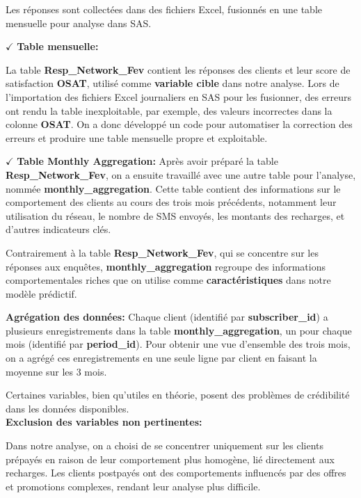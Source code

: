 Les réponses sont collectées dans des fichiers Excel, fusionnés en une table mensuelle pour analyse dans SAS.

\noindent \textbf{\(\checkmark\)} \textbf{Table mensuelle:}

La table \textbf{Resp\_Network\_Fev} contient les réponses des clients et leur score de satisfaction \textbf{OSAT}, utilisé comme \textbf{variable cible} dans notre analyse. Lors de l'importation des fichiers Excel journaliers en SAS pour les fusionner, des erreurs ont rendu la table inexploitable, par exemple, des valeurs incorrectes dans la colonne \textbf{OSAT}. On a donc développé un code pour automatiser la correction des erreurs et produire une table mensuelle propre et exploitable.


\noindent \textbf{\(\checkmark\)} \textbf{Table Monthly Aggregation:} Après avoir préparé la table \textbf{Resp\_Network\_Fev}, on a ensuite travaillé avec une autre table pour l'analyse, nommée \textbf{monthly\_aggregation}. Cette table contient des informations sur le comportement des clients au cours des trois mois précédents, notamment leur utilisation du réseau, le nombre de SMS envoyés, les montants des recharges, et d'autres indicateurs clés. 

Contrairement à la table \textbf{Resp\_Network\_Fev}, qui se concentre sur les réponses aux enquêtes, \textbf{monthly\_aggregation} regroupe des informations comportementales riches que on utilise comme \textbf{caractéristiques} dans notre modèle prédictif.


\noindent \textbf{\checkmark Agrégation des données:} Chaque client (identifié par \textbf{subscriber\_id}) a plusieurs enregistrements dans la table \textbf{monthly\_aggregation}, un pour chaque mois (identifié par \textbf{period\_id}). Pour obtenir une vue d'ensemble des trois mois, on a agrégé ces enregistrements en une seule ligne par client en faisant la moyenne sur les 3 mois.


Certaines variables, bien qu'utiles en théorie, posent des problèmes de crédibilité dans les données disponibles.\\
\noindent \textbf{\checkmark Exclusion des variables non pertinentes:}

Dans notre analyse, on a choisi de se concentrer uniquement sur les clients prépayés en raison de leur comportement plus homogène, lié directement aux recharges. Les clients postpayés ont des comportements influencés par des offres et promotions complexes, rendant leur analyse plus difficile.

